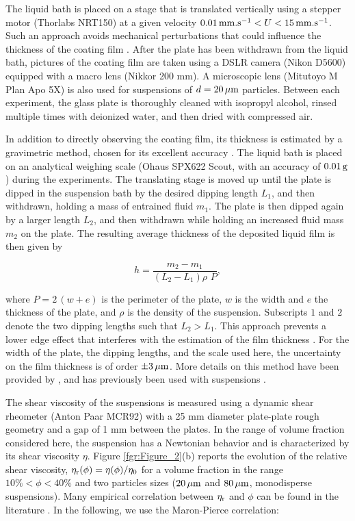 \documentclass{jfm}
\begin{document}
The liquid bath is placed on a stage that is translated vertically using a stepper motor (Thorlabs NRT150) at a given velocity $0.01\,{\rm mm.s^{-1}}<U<15\,{\rm mm.s^{-1}}$. Such an approach avoids mechanical perturbations that could influence the thickness of the coating film \cite[][]{maleki2011landau}. After the plate has been withdrawn from the liquid bath, pictures of the coating film are taken using a DSLR camera (Nikon D5600) equipped with a macro lens (Nikkor 200 mm). A microscopic lens (Mitutoyo M Plan Apo 5X) is also used for suspensions of $d = 20\,\mu{\rm m}$ particles. Between each experiment, the glass plate is thoroughly cleaned with isopropyl alcohol, rinsed multiple times with deionized water, and then dried with compressed air.

In addition to directly observing the coating film, its thickness is estimated by a gravimetric method, chosen for its excellent accuracy \cite[][]{krechetnikov2005experimental}. The liquid bath is placed on an analytical weighing scale (Ohaus SPX622 Scout, with an accuracy of $0.01\,{\rm g}$) during the experiments. The translating stage is moved up until the plate is dipped in the suspension bath by the desired dipping length $L_1$, and then withdrawn, holding a mass of entrained fluid $m_1$. The plate is then dipped again by a larger length $L_2$, and then withdrawn while holding an increased fluid mass $m_2$ on the plate. The resulting average thickness of the deposited liquid film is then given by

\begin{equation}
h= \frac{m_2-m_1}{\left(L_2-L_1\right) \rho\,\,P},
\end{equation}

\noindent where $P=2\,(w+e)$ is the perimeter of the plate, $w$ is the width and $e$ the thickness of the plate, and $\rho$ is the density of the suspension. Subscripts $1$ and $2$ denote the two dipping lengths such that $L_2>L_1$. This approach prevents a lower edge effect that interferes with the estimation of the film thickness \cite[][]{krechetnikov2005experimental}. For the width of the plate, the dipping lengths, and the scale used here, the uncertainty on the film thickness is of order $\pm 3\,\mu{\rm m}$. 
More details on this method have been provided by \cite{krechetnikov2005experimental}, and has previously been used with suspensions  \cite[][]{gans2019dip}.

The shear viscosity of the suspensions is measured using a dynamic shear rheometer (Anton Paar MCR92) with a 25 mm diameter plate-plate rough geometry and a gap of 1 mm between the plates. In the range of volume fraction considered here, the suspension has a Newtonian behavior and is characterized by its shear viscosity $\eta$. Figure \ref{fgr:Figure_2}(b) reports the evolution of the relative shear viscosity, $\eta_{\rm r}(\phi)=\eta(\phi)/\eta_0$ for a volume fraction in the range $10\%<\phi<40\%$ and two particles sizes ($20\,\mu{\rm m}$ and $80\,\mu{\rm m}$, monodisperse suspensions). Many empirical correlation between $\eta_{\rm r}$ and $\phi$ can be found in the literature \cite[][]{stickel2005fluid,guazzelli2018rheology}.
In the following, we use the Maron-Pierce correlation:
\end{document}
